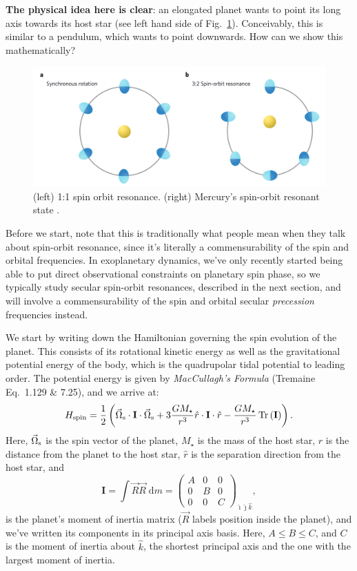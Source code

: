 \documentclass[11pt,
        usenames, %
        dvipsnames %
    ]{article}
\newcommand*{\bm}[1]{\boldsymbol{\mathbf{#1}}}
\newcommand*{\p}[1]{\left(#1\right)}
\DeclareMathOperator{\Tr}{Tr}
\begin{document}
\textbf{The physical idea here is clear}: an elongated planet wants to point its long
axis towards its host star (see left hand side of Fig.~\ref{fig:res}).
Conceivably, this is similar to a pendulum, which wants to point downwards. How
can we show this mathematically?
\begin{figure}
    \centering
    \includegraphics[width=0.5\columnwidth]{res.png}
    \caption{(left) 1:1 spin orbit resonance. (right) Mercury's spin-orbit
    resonant state \citep{cuk2012kick}.}\label{fig:res}
\end{figure}

Before we start, note that this is traditionally what people mean when they talk
about spin-orbit resonance, since it's literally a commensurability of the spin
and orbital frequencies. In exoplanetary dynamics, we've only recently started
being able to put direct observational constraints on planetary spin phase, so
we typically study secular spin-orbit resonances, described in the next section,
and will involve a commensurability of the spin and orbital secular
\emph{precession} frequencies instead.

We start by writing down the Hamiltonian governing the spin evolution of the
planet. This consists of its rotational kinetic energy as well as the
gravitational potential energy of the body, which is the quadrupolar tidal
potential to leading order. The potential energy is given by \emph{MacCullagh's
Formula} (Tremaine Eq.~1.129 \& 7.25), and we arrive at:
\begin{equation}
    H_{\rm spin} = \frac{1}{2}\p{
        \vec{\Omega}_{\rm s} \cdot \bm{I} \cdot \vec{\Omega}_{\rm s}
        + 3\frac{GM_\star}{r^3}\hat{r} \cdot \bm{I} \cdot \hat{r}
        - \frac{GM_\star}{r^3}\Tr\p{\bm{I}}}.\label{eq:Hspin}
\end{equation}
Here, $\vec{\Omega}_{\rm s}$ is the spin vector of the planet, $M_\star$ is the mass of
the host star, $r$ is the distance from the planet to the host star, $\hat{r}$
is the separation direction from the host star, and
\begin{equation}
    \bm{I}
        = \int \vec{R}\vec{R}\;\mathrm{d}m
        = \begin{pmatrix}
            A&0&0\\
            0&B&0\\
            0&0&C
        \end{pmatrix}_{\hat{\imath}\hat{\jmath}\hat{k}},
\end{equation}
is the planet's moment of inertia matrix ($\vec{R}$ labels position inside the
planet), and we've written its components in its principal axis basis. Here, $A
\leq B \leq C$, and $C$ is the moment of inertia about $\hat{k}$, the shortest
principal axis and the one with the largest moment of inertia.
\end{document}
